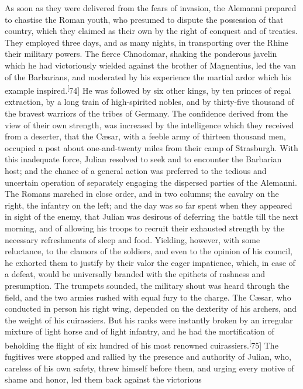 As soon as they were delivered from the fears of invasion, the
Alemanni prepared to chastise the Roman youth, who presumed to
dispute the possession of that country, which they claimed as
their own by the right of conquest and of treaties. They employed
three days, and as many nights, in transporting over the Rhine
their military powers. The fierce Chnodomar, shaking the
ponderous javelin which he had victoriously wielded against the
brother of Magnentius, led the van of the Barbarians, and
moderated by his experience the martial ardor which his example
inspired.\textsuperscript[74] He was followed by six other kings, by ten princes
of regal extraction, by a long train of high-spirited nobles, and
by thirty-five thousand of the bravest warriors of the tribes of
Germany. The confidence derived from the view of their own
strength, was increased by the intelligence which they received
from a deserter, that the Cæsar, with a feeble army of thirteen
thousand men, occupied a post about one-and-twenty miles from
their camp of Strasburgh. With this inadequate force, Julian
resolved to seek and to encounter the Barbarian host; and the
chance of a general action was preferred to the tedious and
uncertain operation of separately engaging the dispersed parties
of the Alemanni. The Romans marched in close order, and in two
columns; the cavalry on the right, the infantry on the left; and
the day was so far spent when they appeared in sight of the
enemy, that Julian was desirous of deferring the battle till the
next morning, and of allowing his troops to recruit their
exhausted strength by the necessary refreshments of sleep and
food. Yielding, however, with some reluctance, to the clamors of
the soldiers, and even to the opinion of his council, he exhorted
them to justify by their valor the eager impatience, which, in
case of a defeat, would be universally branded with the epithets
of rashness and presumption. The trumpets sounded, the military
shout was heard through the field, and the two armies rushed with
equal fury to the charge. The Cæsar, who conducted in person his
right wing, depended on the dexterity of his archers, and the
weight of his cuirassiers. But his ranks were instantly broken by
an irregular mixture of light horse and of light infantry, and he
had the mortification of beholding the flight of six hundred of
his most renowned cuirassiers.\textsuperscript[75] The fugitives were stopped and
rallied by the presence and authority of Julian, who, careless of
his own safety, threw himself before them, and urging every
motive of shame and honor, led them back against the victorious
